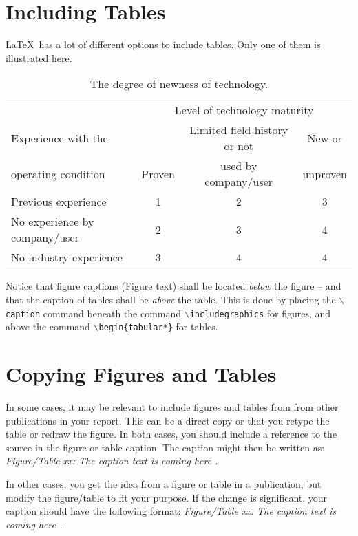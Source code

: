 \documentclass[12pt]{report}
\begin{document}
\section{Including Tables}
\LaTeX\ has a lot of different options to include tables. Only one of them is illustrated here.

\begin{table}
	\centering\small
	\caption{The degree of newness of technology.}
	\label{tab1}
		\begin{tabular*}{\textwidth}{@{\extracolsep{\fill}}lccc}
			\toprule
			  &\multicolumn{3}{c}{Level of technology maturity}\\
  \cmidrule{2-4}
			Experience with the		   &  & Limited field history or not & New or \\
              operating  condition  & Proven &  used by company/user & unproven \\
        
			\midrule
			  Previous experience & 1 & 2 & 3 \\
		          No experience by company/user & 2 & 3 & 4 \\
		          No industry experience & 3 & 4 & 4 \\
			\bottomrule
		\end{tabular*}
\end{table}

\begin{remark}
Notice that figure captions (Figure text) shall be located \emph{below} the figure -- and that the caption of tables shall be \emph{above} the table. This is done by placing the $\backslash$\texttt{caption} command beneath the command $\backslash$\texttt{includegraphics} for figures, and above the command $\backslash$\texttt{begin\{tabular*\}} for tables.
\end{remark}
\section{Copying Figures and Tables}
In some cases, it may be relevant to include figures and tables from from other publications in your report. This can be a direct copy or that you retype the table or redraw the figure. In both cases, you should include a reference to the source in the figure or table caption. The caption might then be written as: \textsl{Figure/Table xx: The caption text is coming here \citep{rausand04}.}

In other cases, you get the idea from a figure or table in a publication, but modify the figure/table to fit your purpose. If the change is significant, your caption should have the following format: \textsl{Figure/Table xx: The caption text is coming here \citep[adapted from][]{rausand04}.}
\end{document}
